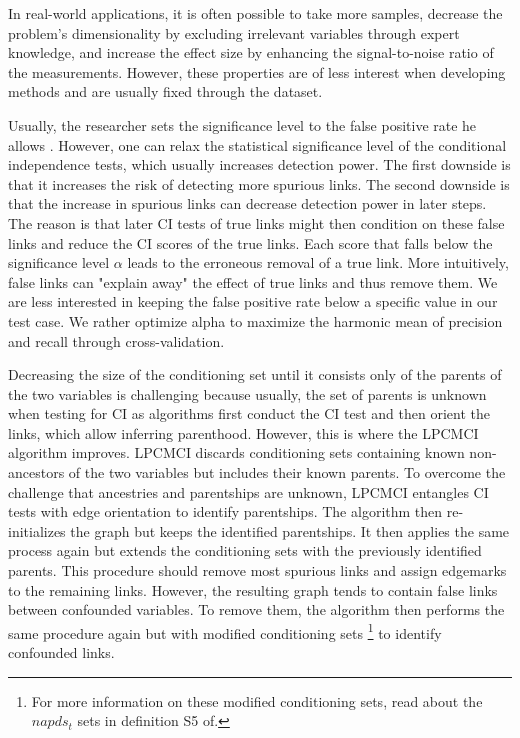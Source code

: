 \documentclass[conference]{IEEEtran}
\begin{document}
In real-world applications, it is often possible to take more samples, decrease the problem's dimensionality by excluding irrelevant variables through expert knowledge, and increase the effect size by enhancing the signal-to-noise ratio of the measurements.
However, these properties are of less interest when developing methods and are usually fixed through the dataset.

Usually, the researcher sets the significance level to the false positive rate he allows \cite{gerhardus_high-recall_2021}.
However, one can relax the statistical significance level of the conditional independence tests, which usually increases detection power.
The first downside is that it increases the risk of detecting more spurious links.
The second downside is that the increase in spurious links can decrease detection power in later steps. The reason is that later CI tests of true links might then condition on these false links and reduce the CI scores of the true links. Each score that falls below the significance level $\alpha$ leads to the erroneous removal of a true link. More intuitively, false links can "explain away" the effect of true links and thus remove them.
We are less interested in keeping the false positive rate below a specific value in our test case. We rather optimize alpha to maximize the harmonic mean of precision and recall through cross-validation.

Decreasing the size of the conditioning set until it consists only of the parents of the two variables is challenging because usually, the set of parents is unknown when testing for CI as algorithms first conduct the CI test and then orient the links, which allow inferring parenthood.
However, this is where the LPCMCI algorithm improves.
LPCMCI\cite{gerhardus_high-recall_2021} discards conditioning sets containing known non-ancestors of the two variables but includes their known parents.
To overcome the challenge that ancestries and parentships are unknown, LPCMCI entangles CI tests with edge orientation to identify parentships. The algorithm then re-initializes the graph but keeps the identified parentships. It then applies the same process again but extends the conditioning sets with the previously identified parents.
This procedure should remove most spurious links and assign edgemarks to the remaining links. However, the resulting graph tends to contain false links between confounded variables. 
To remove them, the algorithm then performs the same procedure again but with modified conditioning sets
\footnote{For more information on these modified conditioning sets, read about the $napds_t$ sets in definition S5 of\cite{gerhardus_high-recall_2021}.} 
to identify confounded links\cite{gerhardus_high-recall_2021}.
\end{document}
